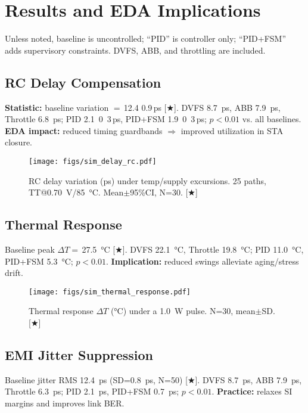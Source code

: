 \documentclass[conference]{IEEEtran}
\newcommand{\meanpm}[2]{#1\,\pm\,#2}
\begin{document}
\section{Results and EDA Implications}
\label{sec:results}
Unless noted, baseline is uncontrolled; “PID” is controller only; “PID+FSM” adds supervisory constraints. DVFS, ABB, and throttling are included.

\subsection{RC Delay Compensation}
\textbf{Statistic:} baseline variation $=\,$\meanpm{12.4}{0.9}\,ps [★]. DVFS \SI{8.7}{ps}, ABB \SI{7.9}{ps}, Throttle \SI{6.8}{ps}; PID \SI{2.1}{0.3}\,ps, PID+FSM \SI{1.9}{0.3}\,ps; $p<0.01$ vs. all baselines.  
\textbf{EDA impact:} reduced timing guardbands $\Rightarrow$ improved utilization in STA closure.

\begin{figure}[t]
\centering
\texttt{[image: figs/sim\_delay\_rc.pdf]}
\caption{RC delay variation (ps) under temp/supply excursions. 25 paths, TT@\SI{0.70}{V}/\SI{85}{\celsius}. Mean$\pm$95\%CI, N=30. [★]}
\label{fig:rc}
\end{figure}

\subsection{Thermal Response}
Baseline peak $\Delta T=\,$\SI{27.5}{\celsius} [★]. DVFS \SI{22.1}{\celsius}, Throttle \SI{19.8}{\celsius}; PID \SI{11.0}{\celsius}, PID+FSM \SI{5.3}{\celsius}; $p<0.01$.  
\textbf{Implication:} reduced swings alleviate aging/stress drift.

\begin{figure}[t]
\centering
\texttt{[image: figs/sim\_thermal\_response.pdf]}
\caption{Thermal response $\Delta T$ (\si{\celsius}) under a \SI{1.0}{W} pulse. N=30, mean$\pm$SD. [★]}
\label{fig:thermal}
\end{figure}

\subsection{EMI Jitter Suppression}
Baseline jitter RMS \SI{12.4}{ps} (SD=\SI{0.8}{ps}, N=50) [★]. DVFS \SI{8.7}{ps}, ABB \SI{7.9}{ps}, Throttle \SI{6.3}{ps}; PID \SI{2.1}{ps}, PID+FSM \SI{0.7}{ps}; $p<0.01$.  
\textbf{Practice:} relaxes SI margins and improves link BER.
\end{document}
